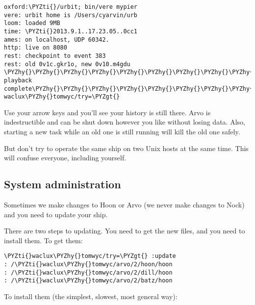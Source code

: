 \begin{framed_shaded}
\begin{Verbatim}[fontsize=\relsize{-2.5},fontseries=b,commandchars=\\\{\}]
oxford:\PYZti{}/urbit; bin/vere mypier
vere: urbit home is /Users/cyarvin/urb
loom: loaded 9MB
time: \PYZti{}2013.9.1..17.23.05..0cc1
ames: on localhost, UDP 60342.
http: live on 8080
rest: checkpoint to event 383
rest: old 0v1c.gkr1o, new 0v10.m4gdu
\PYZhy{}\PYZhy{}\PYZhy{}\PYZhy{}\PYZhy{}\PYZhy{}\PYZhy{}\PYZhy{}\PYZhy{}\PYZhy{}\PYZhy{}\PYZhy{}\PYZhy{}\PYZhy{}\PYZhy{}\PYZhy{} playback complete\PYZhy{}\PYZhy{}\PYZhy{}\PYZhy{}\PYZhy{}\PYZhy{}\PYZhy{}\PYZhy{}\PYZhy{}\PYZhy{}\PYZhy{}\PYZhy{}\PYZhy{}\PYZhy{}\PYZhy{}\PYZhy{}
waclux\PYZhy{}tomwyc/try=\PYZgt{}
\end{Verbatim}
\end{framed_shaded}
Use your arrow keys and you'll see your history is still there.
Arvo is indestructible and can be shut down however you like
without losing data.  Also, starting a new task while an old
one is still running will kill the old one safely.

But don't try to operate the same ship on two Unix hosts at the
same time.  This will confuse everyone, including yourself.

\subsection{System administration}

Sometimes we make changes to Hoon or Arvo (we never make changes
to Nock) and you need to update your ship.

There are two steps to updating.  You need to get the new files,
and you need to install them.  To get them:

\begin{framed_shaded}
\begin{Verbatim}[fontsize=\relsize{-2.5},fontseries=b,commandchars=\\\{\}]
\PYZti{}waclux\PYZhy{}tomwyc/try=\PYZgt{} :update
: /\PYZti{}waclux\PYZhy{}tomwyc/arvo/2/hoon/hoon
: /\PYZti{}waclux\PYZhy{}tomwyc/arvo/2/dill/hoon
: /\PYZti{}waclux\PYZhy{}tomwyc/arvo/2/batz/hoon
\end{Verbatim}
\end{framed_shaded}
To install them (the simplest, slowest, most general way):

